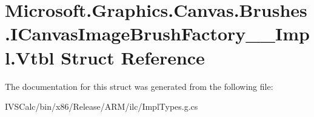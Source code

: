 \hypertarget{struct_microsoft_1_1_graphics_1_1_canvas_1_1_brushes_1_1_i_canvas_image_brush_factory_____impl_1_1_vtbl}{}\section{Microsoft.\+Graphics.\+Canvas.\+Brushes.\+I\+Canvas\+Image\+Brush\+Factory\+\_\+\+\_\+\+Impl.\+Vtbl Struct Reference}
\label{struct_microsoft_1_1_graphics_1_1_canvas_1_1_brushes_1_1_i_canvas_image_brush_factory_____impl_1_1_vtbl}


The documentation for this struct was generated from the following file\+:\begin{DoxyCompactItemize}
\item 
I\+V\+S\+Calc/bin/x86/\+Release/\+A\+R\+M/ilc/Impl\+Types.\+g.\+cs\end{DoxyCompactItemize}
